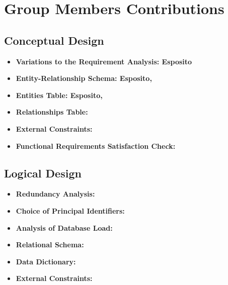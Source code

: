 \section{Group Members Contributions}


\subsection{Conceptual Design}
\begin{itemize}
	\item \textbf{Variations to the Requirement Analysis: Esposito}
	\item \textbf{Entity-Relationship Schema: Esposito, }
	\item \textbf{Entities Table: Esposito, }
	\item \textbf{Relationships Table: }
	\item \textbf{External Constraints:}
	\item \textbf{Functional Requirements Satisfaction Check:}
\end{itemize}

\subsection{Logical Design}
\begin{itemize}
	\item \textbf{Redundancy Analysis:} 
	\item \textbf{Choice of Principal Identifiers:}
	\item \textbf{Analysis of Database Load:}
	\item \textbf{Relational Schema:}
	\item \textbf{Data Dictionary:}
	\item \textbf{External Constraints:}
\end{itemize}	